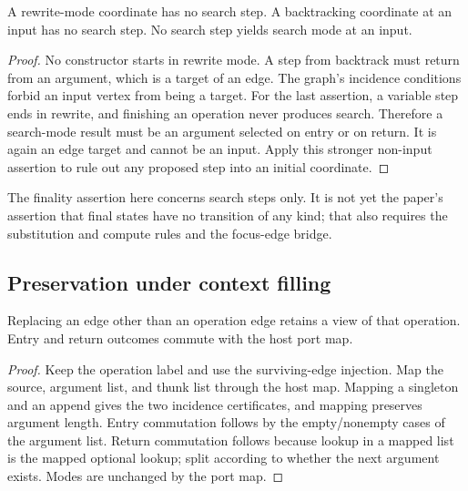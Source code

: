 \begin{lemma}
A rewrite-mode coordinate has no search step. A backtracking coordinate at an
input has no search step. No search step yields search mode at an input.
\end{lemma}
\begin{proof}
No constructor starts in rewrite mode. A step from backtrack must return from
an argument, which is a target of an edge. The graph's incidence conditions
forbid an input vertex from being a target.
For the last assertion, a variable step ends in rewrite, and finishing an
operation never produces search. Therefore a search-mode result must be an
argument selected on entry or on return. It is again an edge target and cannot
be an input. Apply this stronger non-input assertion to rule out any proposed
step into an initial coordinate.
\end{proof}
The finality assertion here concerns search steps only. It is not yet the
paper's assertion that final states have no transition of any kind; that also
requires the substitution and compute rules and the focus-edge bridge.

\subsection{Preservation under context filling}
\begin{lemma}
Replacing an edge other than an operation edge retains a view of that operation.
Entry and return outcomes commute with the host port map.
\end{lemma}
\begin{proof}
Keep the operation label and use the surviving-edge injection. Map the source,
argument list, and thunk list through the host map. Mapping a singleton and an
append gives the two incidence certificates, and mapping preserves argument
length. Entry commutation follows by the empty/nonempty cases of the argument
list. Return commutation follows because lookup in a mapped list is the mapped
optional lookup; split according to whether the next argument exists. Modes
are unchanged by the port map.
\end{proof}

